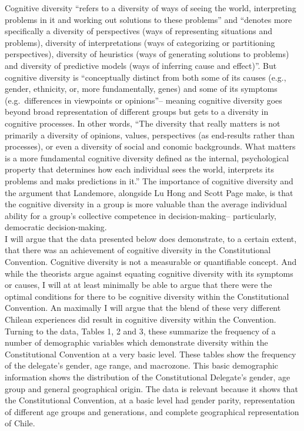 \documentclass[
  man]{apa6}
\begin{document}
Cognitive diversity ``refers to a diversity of ways of seeing the world, interpreting problems in it and working out solutions to these problems'' and ``denotes more specifically a diversity of perspectives (ways of representing situations and problems), diversity of interpretations (ways of categorizing or partitioning perspectives), diversity of heuristics (ways of generating solutions to problems) and diversity of predictive models (ways of inferring cause and effect)''. But cognitive diversity is ``conceptually distinct from both some of its causes (e.g., gender, ethnicity, or, more fundamentally, genes) and some of its symptoms (e.g.~differences in viewpoints or opinions''-- meaning cognitive diversity goes beyond broad representation of different groups but gets to a diversity in cognitive processes. In other words, ``The diversity that really matters is not primarily a diversity of opinions, values, perspectives (as end-results rather than processes), or even a diversity of social and conomic backgrounds. What matters is a more fundamental cognitive diversity defined as the internal, psychological property that determines how each individual sees the world, interprets its problems and maks predictions in it.'' The importance of cognitive diversity and the argument that Landemore, alongside Lu Hong and Scott Page make, is that the cognitive diversity in a group is more valuable than the average individual ability for a group's collective competence in decision-making-- particularly, democratic decision-making.\\
I will argue that the data presented below does demonstrate, to a certain extent, that there was an achievement of cognitive diversity in the Constitutional Convention. Cognitive diversity is not a measurable or quantifiable concept. And while the theorists argue against equating cognitive diversity with its symptoms or causes, I will at at least minimally be able to argue that there were the optimal conditions for there to be cognitive diversity within the Constitutional Convention. An maximally I will argue that the blend of these very different Chilean experiences did result in cognitive diversity within the Convention.
Turning to the data, Tables 1, 2 and 3, these summarize the frequency of a number of demographic variables which demonstrate diversity within the Constitutional Convention at a very basic level. These tables show the frequency of the delegate's gender, age range, and macrozone. This basic demographic information shows the distribution of the Constitutional Delegate's gender, age group and general geographical origin. The data is relevant because it shows that the Constitutional Convention, at a basic level had gender parity, representation of different age groups and generations, and complete geographical representation of Chile.
\end{document}
